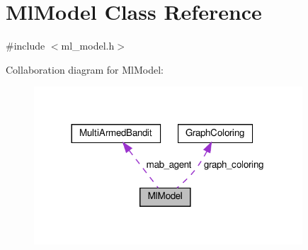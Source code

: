 \hypertarget{classMlModel}{}\section{Ml\+Model Class Reference}
\label{classMlModel}


{\ttfamily \#include $<$ml\+\_\+model.\+h$>$}



Collaboration diagram for Ml\+Model\+:\nopagebreak
\begin{figure}[H]
\begin{center}
\leavevmode
\includegraphics[width=284pt]{classMlModel__coll__graph}
\end{center}
\end{figure}
